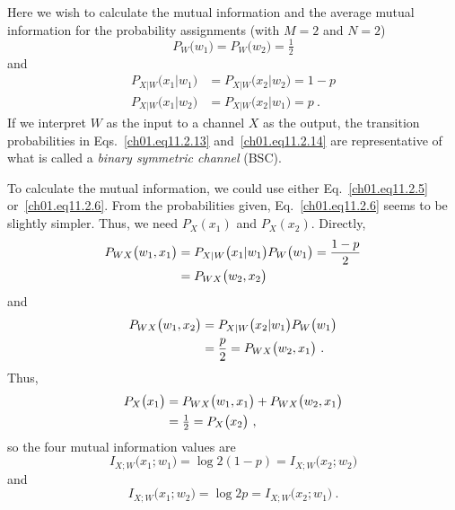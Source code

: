 \begin{example}
\label{ch01.ex11.2.2}
Here we wish to calculate the mutual information and the average
mutual information for the probability assignments
(with $M=2$ and $N=2$)
\begin{equation}
 P_W \big(w_1\big) = P_W \big(w_2\big) = \tfrac{1}{2}
\label{ch01.eq11.2.12}
\end{equation}
and
\begin{align}
 P_{X|W} \big(x_1| w_1\big) & = P_{X|W} \big(x_2| w_2\big) = 1-p
\label{ch01.eq11.2.13} \\
 P_{X|W} \big(x_1| w_2\big) & = P_{X|W} \big(x_2| w_1\big)  = p~.
\label{ch01.eq11.2.14}
\end{align}
If we interpret $W$ as the input to a channel $X$ as the output, the
transition probabilities in Eqs.~\eqref{ch01.eq11.2.13}
and~\eqref{ch01.eq11.2.14} are representative of what is called a
\textit{binary symmetric channel} (BSC).

To calculate the mutual information, we could use either
Eq.~\eqref{ch01.eq11.2.5} or~\eqref{ch01.eq11.2.6}.
From the probabilities given, Eq.~\eqref{ch01.eq11.2.6} seems to be
slightly simpler. Thus, we need
$P_X (x_1)$  and $P_X (x_2)$. Directly,
\begin{align}
 P_{WX} \big(w_1,x_1\big) & = P_{X|W} \big(x_1|w_1\big) P_W \big(w_1\big) =
 \frac{1-p}{2}
 \notag\\
 &= P_{WX} \big(w_2, x_2\big)
\label{ch01.eq11.2.15}
\end{align}
and
\begin{align}
 P_{WX} \big(w_1, x_2\big) & = P_{X|W} \big(x_2 | w_1\big) P_W \big(w_1\big)
 \notag\\
  & = \frac{p}{2} = P_{WX} \big(w_2, x_1\big)~.
\label{ch01.eq11.2.16}
\end{align}
Thus,
\begin{align}
 P_X \big(x_1\big) & = P_{WX} \big(w_1, x_1\big) + P_{WX} \big(w_2, x_1\big)
 \notag\\
  & = \tfrac{1}{2} = P_X \big(x_2\big)~,
\label{ch01.eq11.2.17}
\end{align}
so the four mutual information values are
\begin{equation}
 I_{X;W}\big(x_1; w_1\big)  = \log 2(1-p) = I_{X;W} \big(x_2; w_2\big)
\label{ch01.eq11.2.18}
\end{equation}
and
\begin{equation}
 I_{X;W}\big(x_1 ; w_2\big)  = \log 2p = I_{X;W} \big(x_2; w_1\big) ~.
\label{ch01.eq11.2.19}
\end{equation}


\end{example}
